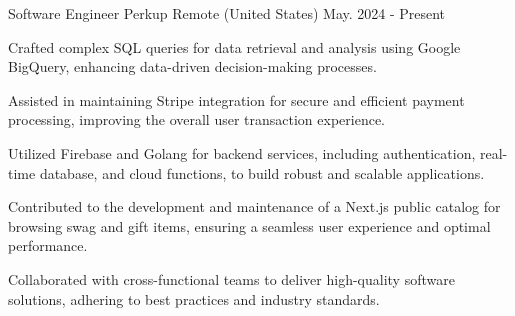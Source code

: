 

\begin{cventries}

\cventry
{Software Engineer} %
{Perkup} %
{Remote (United States)} %
{May. 2024 - Present} %
{
  \begin{cvitems} %
    \item{Crafted complex SQL queries for data retrieval and analysis using Google BigQuery, enhancing data-driven decision-making processes.}
    \item{Assisted in maintaining Stripe integration for secure and efficient payment processing, improving the overall user transaction experience.}
    \item{Utilized Firebase and Golang for backend services, including authentication, real-time database, and cloud functions, to build robust and scalable applications.}
    \item{Contributed to the development and maintenance of a Next.js public catalog for browsing swag and gift items, ensuring a seamless user experience and optimal performance.}
    \item{Collaborated with cross-functional teams to deliver high-quality software solutions, adhering to best practices and industry standards.}
  \end{cvitems}
}


\end{cventries}
